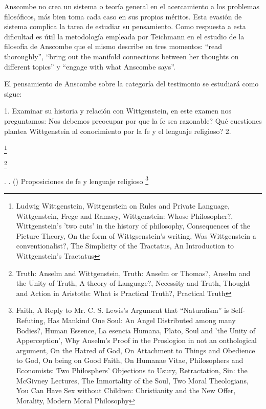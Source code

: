 \documentclass[11pt]{article}
\begin{document}
{\begin{spacing}{1.5}
\begin{spacing}{1}
Anscombe no crea un sistema o teoría general en el acercamiento a los problemas filosóficos, más bien toma cada caso en sus propios méritos. Esta evasión de sistema complica la tarea de estudiar su pensamiento. Como respuesta a esta dificultad es útil la metodología empleada por Teichmann en el estudio de la filosofía de Anscombe que el mismo describe en tres momentos: ``read thoroughly'', ``bring out the manifold connections between her thoughts on different topics'' y ``engage with what Anscombe says''.

El pensamiento de Anscombe sobre la categoría del testimonio se estudiará como sigue:

1. Examinar su historia y relación con Wittgenstein, en este examen nos preguntamos: Nos debemos preocupar por que la fe sea razonable? Qué cuestiones plantea Wittgenstein al conocimiento por la fe y el lenguaje religioso?
2. 


\end{spacing}
\footnote{
Ludwig Wittgenstein, 
Wittgenstein on Rules and Private Language, 
Wittgenstein, Frege and Ramsey, 
Wittgenstein: Whose Philosopher?, 
Wittgenstein's 'two cuts' in the history of philosophy, 
Consequences of the Picture Theory, 
On the form of Wittgsenstein's writing, 
Was Wittgenstein a conventionalist?, 
The Simplicity of the Tractatus, 
An Introduction to Wittgenstein's Tractatus
}

\footnote{
Truth: Anselm and Wittgenstein, 
Truth: Anselm or Thomas?, 
Anselm and the Unity of Truth, 
A theory of Language?, 
Necessity and Truth, 
Thought and Action in Aristotle: What is Practical Truth?, 
Practical Truth
}


\tab \tab \tab {}. 
. 
()
Proposiciones de fe y lenguaje religioso
\footnote{
Faith, 
A Reply to Mr. C. S. Lewis's Argument that “Naturalism” is Self- Refuting, 
Has Mankind One Soul: An Angel Distributed among many Bodies?, 
Human Essence, 
La esencia Humana, 
Plato, Soul and 'the Unity of Apperception', 
Why Anselm's Proof in the Proslogion in not an onthological argument, 
On the Hatred of God, 
On Attachment to Things and Obedience to God, 
On being on Good Faith, 
On Humanae Vitae, 
Philosophers and Economists: Two Philosphers' Objections to Usury, 
Retractation, 
Sin: the McGivney Lectures, 
The Inmortality of the Soul, 
Two Moral Theologians, 
You Can Have Sex without Children: Christianity and the New Offer, 
Morality, 
Modern Moral Philosophy
}


\end{spacing}}
\end{document}
